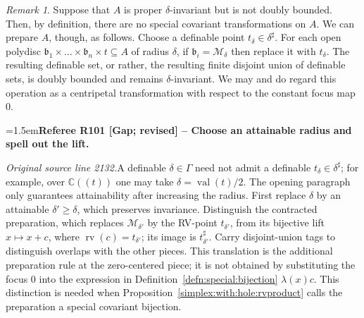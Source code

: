 \documentclass[12pt]{amsart}
\newcommand{\RefereeRemark}[4]{%
  \par\medskip\begingroup\normalfont\small\color{RefereePurple}%
  \emergencystretch=1.5em\noindent\textbf{Referee R#1 [#2] -- #3.}\par\nobreak\noindent #4\par
  \endgroup\medskip
}
\theoremstyle{plain}
\theoremstyle{definition}
\theoremstyle{remark}
\newtheorem{rem}[thm]{Remark}
\numberwithin{equation}{section}
\theoremstyle{plain}
\newcommand{\MM}{\mdl M}
\newcommand{\C}{\mathds{C}}
\newcommand{\gb}{\mathfrak{b}}
\newcommand{\0}{\emptyset}
\newcommand{\mdl}[1]{\mathcal{#1}}  %
\newcommand{\sub}{\subseteq}
\DeclareMathOperator{\rv}{rv}
\DeclareMathOperator{\vv}{val}
\begin{document}
\begin{rem}\label{spec:addendum}
Suppose that $A$ is proper $\delta$-invariant but is not doubly bounded. Then, by definition, there  are no special covariant transformations on $A$. We can prepare $A$, though, as follows. Choose a definable point $t_\delta \in \delta^\sharp$. For each open polydisc $\gb_1 \times \ldots \times \gb_n \times t \sub A$ of radius $\delta$, if $\gb_i= \MM_\delta$ then replace it with $t_\delta$. The resulting definable set, or rather, the resulting finite disjoint union of definable sets, is doubly bounded and remains $\delta$-invariant. We may and do regard this operation as a centripetal transformation with respect to the constant focus map $0$.
\end{rem}

\RefereeRemark{101}{Gap; revised}{Choose an attainable radius and spell out the lift}{%
\textit{Original source line 2132.}\quad A definable $\delta\in\Gamma$ need not admit a definable $t_\delta\in\delta^\sharp$; for example, over $\C((t))$ one may take $\delta=\vv(t)/2$. The opening paragraph only guarantees attainability after increasing the radius. First replace $\delta$ by an attainable $\delta'\geq\delta$, which preserves invariance. Distinguish the contracted preparation, which replaces $\MM_{\delta'}$ by the RV-point $t_{\delta'}$, from its bijective lift $x\mapsto x+c$, where $\rv(c)=t_{\delta'}$; its image is $t_{\delta'}^\sharp$. Carry disjoint-union tags to distinguish overlaps with the other pieces. This translation is the additional preparation rule at the zero-centered piece; it is not obtained by substituting the focus $0$ into the expression in Definition~\ref{defn:special:bijection} $\lambda(x)c$. This distinction is needed when Proposition~\ref{simplex:with:hole:rvproduct} calls the preparation a special covariant bijection.
}
\end{document}
